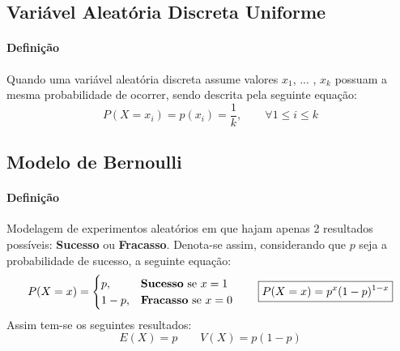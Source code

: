 \documentclass{article}
\begin{document}
        \subsection{Variável Aleatória Discreta Uniforme}
            \paragraph{Definição}Quando uma variável aleatória discreta assume valores $x_{1}$, ... , $x_{k}$ possuam a mesma probabilidade de ocorrer, sendo descrita pela seguinte equação:
                \begin{equation}
                    \boxed{
                        P(X = x_{i}) = p(x_{i}) = \frac{1}{k},
                        \qquad
                        \forall 1 \le i \le k
                    }
                \end{equation}

        \subsection{Modelo de Bernoulli}
            \paragraph{Definição}Modelagem de experimentos aleatórios em que hajam apenas 2 resultados possíveis: \textbf{Sucesso} ou \textbf{Fracasso}. Denota-se assim, considerando que $p$ seja a probabilidade de sucesso,  a seguinte equação:
                \begin{equation}
                    P(X=x) = 
                    \begin{cases}
                        p,   & \text{\textbf{Sucesso} se $x=1$}\\
                        1-p, & \text{\textbf{Fracasso} se $x=0$}\\
                    \end{cases}
                    \qquad
                    \boxed{
                        P(X=x)=p^{x}(1 - p)^{1-x}
                    }
                \end{equation}
            Assim tem-se os seguintes resultados:
                \begin{equation}
                    \boxed{
                        E(X) = p
                    }
                    \qquad
                    \boxed{
                        V(X) = p(1 - p)
                    }
                \end{equation}
\end{document}

